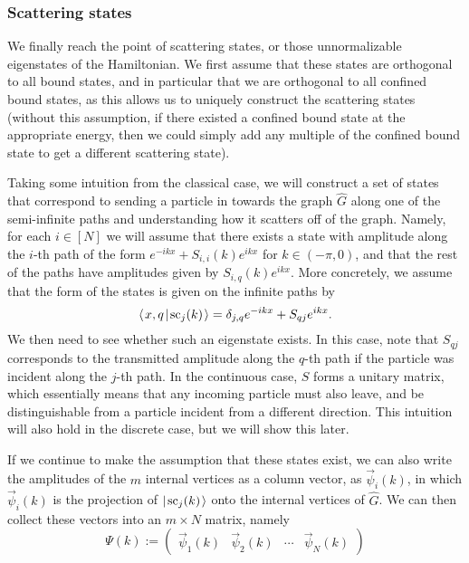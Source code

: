 \documentclass[../thesis-main/thesis-main]{subfiles}
\begin{document}
\subsubsection{Scattering states}

We finally reach the point of scattering states, or those unnormalizable eigenstates of the Hamiltonian.  We first assume that these states are orthogonal to all bound states, and in particular that we are orthogonal to all confined bound states, as this allows us to uniquely construct the scattering states (without this assumption, if there existed a confined bound state at the appropriate energy, then we could simply add any multiple of the confined bound state to get a different scattering state).

Taking some intuition from the classical case, we will construct a set of states that correspond to sending a particle in towards the graph $\widehat{G}$ along one of the semi-infinite paths and understanding how it scatters off of the graph.  Namely, for each $i\in[N]$ we will assume that there exists a state with amplitude along the $i$-th path of the form $e^{-i k x} + S_{i,i}(k)e^{i k x}$ for $k\in (-\pi, 0)$, and that the rest of the paths have amplitudes given by $S_{i,q}(k)e^{ikx}$.  More concretely, we assume that the form of the states is given on the infinite paths by
\begin{equation}
  \langle\mspace{2mu} x,q \mspace{2mu} | \mspace{2mu} \text{sc}_{j}(k)\mspace{2mu} \rangle = \delta_{j,q} e^{-i k x} + S_{qj} e^{i k x}.\label{eq:scattering_amplitude_paths}
\end{equation}
We then need to see whether such an eigenstate exists.  In this case, note that $S_{qj}$ corresponds to the transmitted amplitude along the $q$-th path if the particle was incident along the $j$-th path.  In the continuous case, $S$ forms a unitary matrix, which essentially means that any incoming particle must also leave, and be distinguishable from a particle incident from a different direction.  This intuition will also hold in the discrete case, but we will show this later.

If we continue to make the assumption that these states exist, we can also write the amplitudes of the $m$ internal vertices as a column vector, as $\vec{\psi}_i(k)$, in which $\vec{\psi}_{i}(k)$ is the projection of $|\mspace{2mu} \text{sc}_j(k) \mspace{2mu} \rangle$ onto the internal vertices of $\widehat{G}$.  We can then collect these vectors into an $m\times N$ matrix, namely
\begin{equation}
  \Psi(k) := \begin{pmatrix} \vec{\psi}_1(k) & \vec{\psi}_2(k) & \cdots & \vec{\psi}_N(k)\end{pmatrix}
\end{equation}
\end{document}

